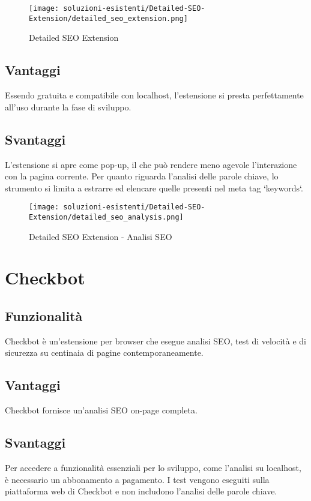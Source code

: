 \begin{figure}[H]
    \centering 
    \texttt{[image: soluzioni-esistenti/Detailed-SEO-Extension/detailed\_seo\_extension.png]} 
    \caption{Detailed SEO Extension}
\end{figure}

\subsection{Vantaggi}
\par Essendo gratuita e compatibile con localhost, l'estensione si presta perfettamente all'uso durante la fase di sviluppo.

\subsection{Svantaggi}
\par L'estensione si apre come pop-up, il che può rendere meno agevole l'interazione con la pagina corrente. Per quanto riguarda l'analisi delle parole chiave, lo strumento si limita a estrarre ed elencare quelle presenti nel meta tag `keywords`.

\begin{figure}[H]
    \centering 
    \texttt{[image: soluzioni-esistenti/Detailed-SEO-Extension/detailed\_seo\_analysis.png]} 
    \caption{Detailed SEO Extension - Analisi SEO}
\end{figure}

\section{Checkbot}

\subsection{Funzionalità}
\par Checkbot è un'estensione per browser che esegue analisi SEO, test di velocità e di sicurezza su centinaia di pagine contemporaneamente.

\subsection{Vantaggi}
\par Checkbot fornisce un'analisi SEO on-page completa.

\subsection{Svantaggi}
\par Per accedere a funzionalità essenziali per lo sviluppo, come l'analisi su localhost, è necessario un abbonamento a pagamento. I test vengono eseguiti sulla piattaforma web di Checkbot e non includono l'analisi delle parole chiave.

